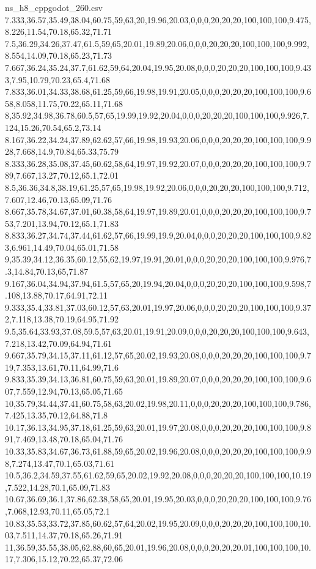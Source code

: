 \begin{filecontents*}[overwrite]{ns_h8_cppgodot_260.csv}
7.333,36.57,35.49,38.04,60.75,59,63,20,19.96,20.03,0,0,0,20,20,20,100,100,100,9.475,8.226,11.54,70.18,65.32,71.71
7.5,36.29,34.26,37.47,61.5,59,65,20.01,19.89,20.06,0,0,0,20,20,20,100,100,100,9.992,8.554,14.09,70.18,65.23,71.73
7.667,36.24,35.24,37.7,61.62,59,64,20.04,19.95,20.08,0,0,0,20,20,20,100,100,100,9.433,7.95,10.79,70.23,65.4,71.68
7.833,36.01,34.33,38.68,61.25,59,66,19.98,19.91,20.05,0,0,0,20,20,20,100,100,100,9.658,8.058,11.75,70.22,65.11,71.68
8,35.92,34.98,36.78,60.5,57,65,19.99,19.92,20.04,0,0,0,20,20,20,100,100,100,9.926,7.124,15.26,70.54,65.2,73.14
8.167,36.22,34.24,37.89,62.62,57,66,19.98,19.93,20.06,0,0,0,20,20,20,100,100,100,9.928,7.668,14.9,70.84,65.33,75.79
8.333,36.28,35.08,37.45,60.62,58,64,19.97,19.92,20.07,0,0,0,20,20,20,100,100,100,9.789,7.667,13.27,70.12,65.1,72.01
8.5,36.36,34.8,38.19,61.25,57,65,19.98,19.92,20.06,0,0,0,20,20,20,100,100,100,9.712,7.607,12.46,70.13,65.09,71.76
8.667,35.78,34.67,37.01,60.38,58,64,19.97,19.89,20.01,0,0,0,20,20,20,100,100,100,9.753,7.201,13.94,70.12,65.1,71.83
8.833,36.27,34.74,37.44,61.62,57,66,19.99,19.9,20.04,0,0,0,20,20,20,100,100,100,9.823,6.961,14.49,70.04,65.01,71.58
9,35.39,34.12,36.35,60.12,55,62,19.97,19.91,20.01,0,0,0,20,20,20,100,100,100,9.976,7.3,14.84,70.13,65,71.87
9.167,36.04,34.94,37.94,61.5,57,65,20,19.94,20.04,0,0,0,20,20,20,100,100,100,9.598,7.108,13.88,70.17,64.91,72.11
9.333,35.4,33.81,37.03,60.12,57,63,20.01,19.97,20.06,0,0,0,20,20,20,100,100,100,9.372,7.118,13.38,70.19,64.95,71.92
9.5,35.64,33.93,37.08,59.5,57,63,20.01,19.91,20.09,0,0,0,20,20,20,100,100,100,9.643,7.218,13.42,70.09,64.94,71.61
9.667,35.79,34.15,37.11,61.12,57,65,20.02,19.93,20.08,0,0,0,20,20,20,100,100,100,9.719,7.353,13.61,70.11,64.99,71.6
9.833,35.39,34.13,36.81,60.75,59,63,20.01,19.89,20.07,0,0,0,20,20,20,100,100,100,9.607,7.559,12.94,70.13,65.05,71.65
10,35.79,34.44,37.41,60.75,58,63,20.02,19.98,20.11,0,0,0,20,20,20,100,100,100,9.786,7.425,13.35,70.12,64.88,71.8
10.17,36.13,34.95,37.18,61.25,59,63,20.01,19.97,20.08,0,0,0,20,20,20,100,100,100,9.891,7.469,13.48,70.18,65.04,71.76
10.33,35.83,34.67,36.73,61.88,59,65,20.02,19.96,20.08,0,0,0,20,20,20,100,100,100,9.98,7.274,13.47,70.1,65.03,71.61
10.5,36.2,34.59,37.55,61.62,59,65,20.02,19.92,20.08,0,0,0,20,20,20,100,100,100,10.19,7.522,14.28,70.1,65.09,71.83
10.67,36.69,36.1,37.86,62.38,58,65,20.01,19.95,20.03,0,0,0,20,20,20,100,100,100,9.76,7.068,12.93,70.11,65.05,72.1
10.83,35.53,33.72,37.85,60.62,57,64,20.02,19.95,20.09,0,0,0,20,20,20,100,100,100,10.03,7.511,14.37,70.18,65.26,71.91
11,36.59,35.55,38.05,62.88,60,65,20.01,19.96,20.08,0,0,0,20,20,20.01,100,100,100,10.17,7.306,15.12,70.22,65.37,72.06

\end{filecontents*}
